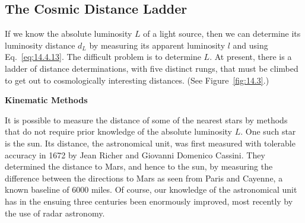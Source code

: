 %

\subsection{The Cosmic Distance Ladder}\label{sec:14.5}

If we know the absolute luminosity \(L\) of a light source, then we can
determine its luminosity distance \(d_L\) by measuring its apparent
luminosity \(l\) and using Eq.~\eqref{eq:14.4.13}. The difficult problem is
to determine \(L\). At present, there is a ladder of distance
determinations, with five distinct rungs, that must be climbed to get out to
cosmologically interesting distances. (See Figure~\ref{fig:14.3}.)

\medskip
\noindent\textbf{Kinematic Methods}
\par\smallskip

It is possible to measure the distance of some of the nearest stars by
methods that do not require prior knowledge of the absolute luminosity
\(L\). One such star is the sun. Its distance, the astronomical unit, was
first measured with tolerable accuracy in 1672 by Jean Richer and Giovanni
Domenico Cassini. They determined the distance to Mars, and hence to the sun,
by measuring the difference between the directions to Mars as seen from
Paris and Cayenne, a known baseline of 6000 miles. Of course, our knowledge
of the astronomical unit has in the ensuing three centuries been enormously
improved, most recently by the use of radar astronomy.

